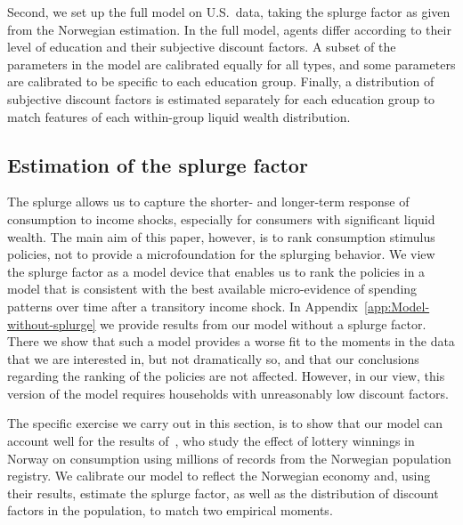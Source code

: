 \documentclass[qe]{econsocart}
\begin{document}
Second, we set up the full model on U.S.\ data, taking the splurge factor as given from the Norwegian estimation. In the full model, agents differ according to their level of education and their subjective discount factors. A subset of the parameters in the model are calibrated equally for all types, and some parameters are calibrated to be specific to each education group. Finally, a distribution of subjective discount factors is estimated separately for each education group to match features of each within-group liquid wealth distribution.

\subsection{Estimation of the splurge factor}
\label{sec:splurge}

The splurge allows us to capture the shorter- and longer-term response of consumption to income shocks, especially for consumers with significant liquid wealth. The main aim of this paper, however, is to rank consumption stimulus policies, not to provide a microfoundation for the splurging behavior. We view the splurge factor as a model device that enables us to rank the policies in a model that is consistent with the best available micro-evidence of spending patterns over time after a transitory income shock. In Appendix~\ref{app:Model-without-splurge} we provide results from our model without a splurge factor. There we show that such a model provides a worse fit to the moments in the data that we are interested in, but not dramatically so, and that our conclusions regarding the ranking of the policies are not affected. However, in our view, this version of the model requires households with unreasonably low discount factors.

The specific exercise we carry out in this section, is to show that our model can account well for the results of~\cite{fagereng-mpc-2021}, who study the effect of lottery winnings in Norway on consumption using millions of records from the Norwegian population registry. We calibrate our model to reflect the Norwegian economy and, using their results, estimate the splurge factor, as well as the distribution of discount factors in the population, to match two empirical moments.
\end{document}
